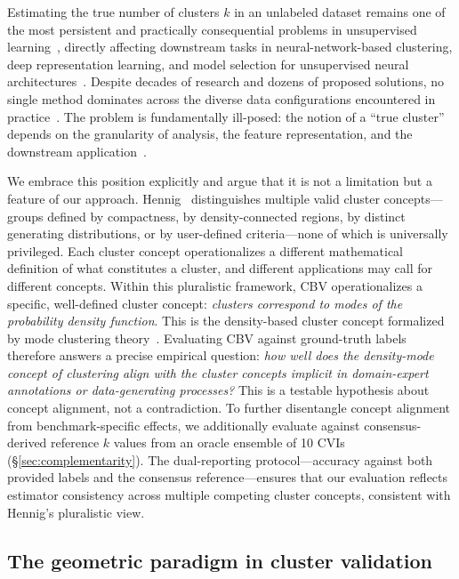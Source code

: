 \documentclass[journal]{IEEEtran}
\begin{document}
Estimating the true number of clusters $k$ in an unlabeled dataset remains one of the most persistent and practically consequential problems in unsupervised learning~\cite{ding2004cluster, luxburg2012clustering}, directly affecting downstream tasks in neural-network-based clustering, deep representation learning, and model selection for unsupervised neural architectures~\cite{xie2016deep, jiang2017vade}. Despite decades of research and dozens of proposed solutions, no single method dominates across the diverse data configurations encountered in practice~\cite{arbelaitz2013extensive}. The problem is fundamentally ill-posed: the notion of a ``true cluster'' depends on the granularity of analysis, the feature representation, and the downstream application~\cite{hennig2015true}.

We embrace this position explicitly and argue that it is not a limitation but a feature of our approach. Hennig~\cite{hennig2015true} distinguishes multiple valid cluster concepts---groups defined by compactness, by density-connected regions, by distinct generating distributions, or by user-defined criteria---none of which is universally privileged. Each cluster concept operationalizes a different mathematical definition of what constitutes a cluster, and different applications may call for different concepts. Within this pluralistic framework, CBV operationalizes a specific, well-defined cluster concept: \emph{clusters correspond to modes of the probability density function}. This is the density-based cluster concept formalized by mode clustering theory~\cite{chacon2015population}. Evaluating CBV against ground-truth labels therefore answers a precise empirical question: \emph{how well does the density-mode concept of clustering align with the cluster concepts implicit in domain-expert annotations or data-generating processes?} This is a testable hypothesis about concept alignment, not a contradiction. To further disentangle concept alignment from benchmark-specific effects, we additionally evaluate against consensus-derived reference $k$ values from an oracle ensemble of 10 CVIs (§\ref{sec:complementarity}). The dual-reporting protocol---accuracy against both provided labels and the consensus reference---ensures that our evaluation reflects estimator consistency across multiple competing cluster concepts, consistent with Hennig's pluralistic view.

\subsection{The geometric paradigm in cluster validation}
\label{sec:geometric-paradigm}
\end{document}

